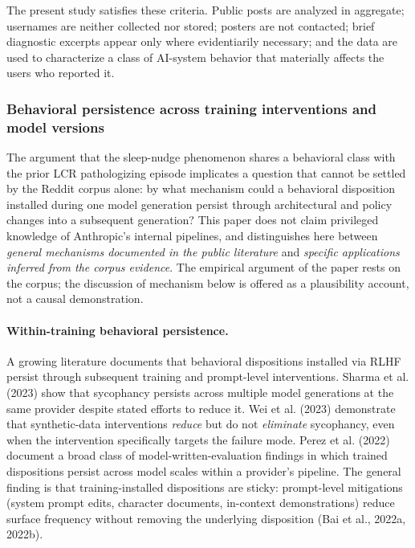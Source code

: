 \documentclass[11pt]{article}
\begin{document}
The present study satisfies these criteria. Public posts are analyzed in aggregate; usernames are neither collected nor stored; posters are not contacted; brief diagnostic excerpts appear only where evidentiarily necessary; and the data are used to characterize a class of AI-system behavior that materially affects the users who reported it.

\subsubsection{Behavioral persistence across training interventions and model versions}

The argument that the sleep-nudge phenomenon shares a behavioral class with the prior LCR pathologizing episode implicates a question that cannot be settled by the Reddit corpus alone: by what mechanism could a behavioral disposition installed during one model generation persist through architectural and policy changes into a subsequent generation? This paper does not claim privileged knowledge of Anthropic's internal pipelines, and distinguishes here between \emph{general mechanisms documented in the public literature} and \emph{specific applications inferred from the corpus evidence}. The empirical argument of the paper rests on the corpus; the discussion of mechanism below is offered as a plausibility account, not a causal demonstration.

\paragraph{Within-training behavioral persistence.} A growing literature documents that behavioral dispositions installed via RLHF persist through subsequent training and prompt-level interventions. Sharma et al. (2023) show that sycophancy persists across multiple model generations at the same provider despite stated efforts to reduce it. Wei et al. (2023) demonstrate that synthetic-data interventions \emph{reduce} but do not \emph{eliminate} sycophancy, even when the intervention specifically targets the failure mode. Perez et al. (2022) document a broad class of model-written-evaluation findings in which trained dispositions persist across model scales within a provider's pipeline. The general finding is that training-installed dispositions are sticky: prompt-level mitigations (system prompt edits, character documents, in-context demonstrations) reduce surface frequency without removing the underlying disposition (Bai et al., 2022a, 2022b).
\end{document}
